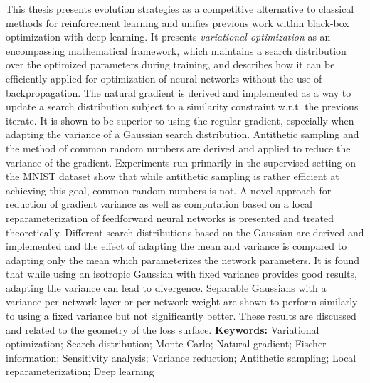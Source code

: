 This thesis presents evolution strategies as a competitive alternative to classical methods for reinforcement learning and unifies previous work within black-box optimization with deep learning. It presents \textit{variational optimization} as an encompassing mathematical framework, which maintains a search distribution over the optimized parameters during training, and describes how it can be efficiently applied for optimization of neural networks without the use of backpropagation.
\newline
The natural gradient is derived and implemented as a way to update a search distribution subject to a similarity constraint w.r.t. the previous iterate. It is shown to be superior to using the regular gradient, especially when adapting the variance of a Gaussian search distribution.
\newline
Antithetic sampling and the method of common random numbers are derived and applied to reduce the variance of the gradient. Experiments run primarily in the supervised setting on the MNIST dataset show that while antithetic sampling is rather efficient at achieving this goal, common random numbers is not. A novel approach for reduction of gradient variance as well as computation based on a local reparameterization of feedforward neural networks is presented and treated theoretically.
\newline
Different search distributions based on the Gaussian are derived and implemented and the effect of adapting the mean and variance is compared to adapting only the mean which parameterizes the network parameters.
It is found that while using an isotropic Gaussian with fixed variance provides good results, adapting the variance can lead to divergence. 
Separable Gaussians with a variance per network layer or per network weight are shown to perform similarly to using a fixed variance but not significantly better. These results are discussed and related to the geometry of the loss surface.
\newline
\newline
\textbf{Keywords:} Variational optimization; Search distribution; Monte Carlo; Natural gradient; Fischer information; Sensitivity analysis; Variance reduction; Antithetic sampling; Local reparameterization; Deep learning





